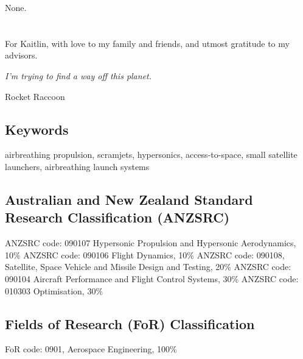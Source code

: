 None.

\clearpage

\section*{} 
  For Kaitlin, with love to my family and friends, and utmost gratitude to my advisors. 

      \vspace*{\fill}
\begin{flushright}
	\textit{I'm trying to find a way off this planet.}
	
Rocket Raccoon
\end{flushright}
\clearpage
\subsection*{Keywords}
  airbreathing propulsion, scramjets, hypersonics, access-to-space, small satellite launchers, airbreathing launch systems

\subsection*{Australian and New Zealand Standard Research Classification (ANZSRC)}

  ANZSRC code: 090107 Hypersonic Propulsion and Hypersonic Aerodynamics, 10\% \newline
 ANZSRC code: 090106 Flight Dynamics, 10\% \newline
 ANZSRC code: 090108, Satellite, Space Vehicle and Missile Design and Testing, 20\% \newline
ANZSRC code: 090104 Aircraft Performance and Flight Control Systems, 30\% \newline
ANZSRC code: 010303 Optimisation, 30\% \newline

\subsection*{Fields of Research (FoR) Classification}

  FoR code: 0901, Aerospace Engineering, 100\%

\tableofcontents

\listoffigures
{}
\listoftables
{}
\printnomenclature